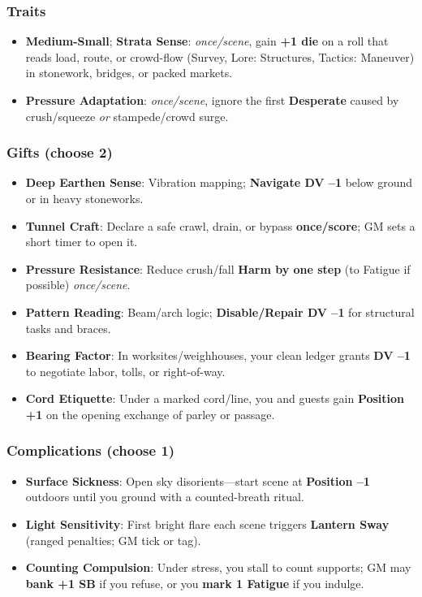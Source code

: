 \documentclass[11pt,letterpaper]{article}
\begin{document}
\subsubsection*{Traits}
\begin{itemize}
\item \textbf{Medium-Small}; \textbf{Strata Sense}: \emph{once/scene}, gain \textbf{+1 die} on a roll that reads load, route, or crowd-flow (Survey, Lore: Structures, Tactics: Maneuver) in stonework, bridges, or packed markets.
\item \textbf{Pressure Adaptation}: \emph{once/scene}, ignore the first \textbf{Desperate} caused by crush/squeeze \emph{or} stampede/crowd surge.
\end{itemize}

\subsubsection*{Gifts (choose 2)}
\begin{itemize}
\item \textbf{Deep Earthen Sense}: Vibration mapping; \textbf{Navigate DV --1} below ground or in heavy stoneworks.
\item \textbf{Tunnel Craft}: Declare a safe crawl, drain, or bypass \textbf{once/score}; GM sets a short timer to open it.
\item \textbf{Pressure Resistance}: Reduce crush/fall \textbf{Harm by one step} (to Fatigue if possible) \emph{once/scene}.
\item \textbf{Pattern Reading}: Beam/arch logic; \textbf{Disable/Repair DV --1} for structural tasks and braces.
\item \textbf{Bearing Factor}: In worksites/weighhouses, your clean ledger grants \textbf{DV --1} to negotiate labor, tolls, or right-of-way.
\item \textbf{Cord Etiquette}: Under a marked cord/line, you and guests gain \textbf{Position +1} on the opening exchange of parley or passage.
\end{itemize}

\subsubsection*{Complications (choose 1)}
\begin{itemize}
\item \textbf{Surface Sickness}: Open sky disorients---start scene at \textbf{Position --1} outdoors until you ground with a counted-breath ritual.
\item \textbf{Light Sensitivity}: First bright flare each scene triggers \textbf{Lantern Sway} (ranged penalties; GM tick or tag).
\item \textbf{Counting Compulsion}: Under stress, you stall to count supports; GM may \textbf{bank +1 SB} if you refuse, or you \textbf{mark 1 Fatigue} if you indulge.
\end{itemize}
\end{document}
